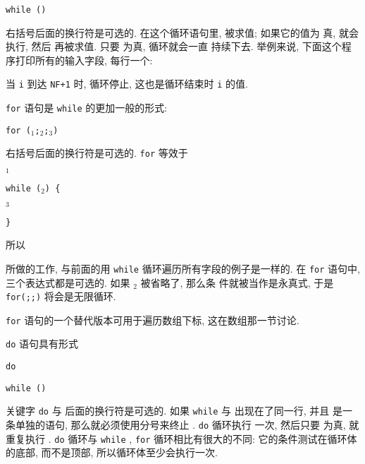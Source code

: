 \begin{pattern}
    \verb'while ('\expr\verb')' \par
    \indent\indent\stmt
\end{pattern}
右括号后面的换行符是可选的. 在这个循环语句里, \expr 被求值; 如果它的值为
真, \stmt 就会执行, 然后 \expr 再被求值. 只要 \expr 为真, 循环就会一直
持续下去. 举例来说, 下面这个程序打印所有的输入字段, 每行一个:
当 \verb'i' 到达 \verb'NF+1' 时, 循环停止, 这也是循环结束时 \verb'i' 的值.

\verb'for' 语句是 \verb'while' 的更加一般的形式:
\begin{pattern}
    \verb'for ('\expr$_1$\verb';'\expr$_2$\verb';'\expr$_3$\verb')' \par
    \indent\indent\stmt
\end{pattern}
右括号后面的换行符是可选的. \verb'for' 等效于
\begin{pattern}
    \expr$_1$ \par
    \verb'while ('\expr$_2$\verb') {' \par
        \indent\indent\stmt  \par
        \indent\indent\expr$_3$ \par
    \verb'}'
\end{pattern}
所以
所做的工作, 与前面的用 \verb'while' 循环遍历所有字段的例子是一样的. 在
\verb'for' 语句中, 三个表达式都是可选的. 如果 \expr$_2$ 被省略了, 那么条
件就被当作是永真式, 于是 \verb'for(;;)' 将会是无限循环.

\verb'for' 语句的一个替代版本可用于遍历数组下标, 这在数组那一节讨论.

\verb'do' 语句具有形式
\begin{pattern}
    \verb'do' \par
    \indent\indent\stmt\par
    \verb'while ('\expr\verb')'
\end{pattern}
关键字 \verb'do' 与 \stmt 后面的换行符是可选的. 如果 \verb'while' 与 \stmt
出现在了同一行, 并且 \stmt 是一条单独的语句, 那么就必须使用分号来终止
\stmt. \verb'do' 循环执行 \stmt 一次, 然后只要 \expr 为真, 就重复执行
\stmt. \verb'do' 循环与 \verb'while' , \verb'for' 循环相比有很大的不同:
它的条件测试在循环体的底部, 而不是顶部, 所以循环体至少会执行一次.

